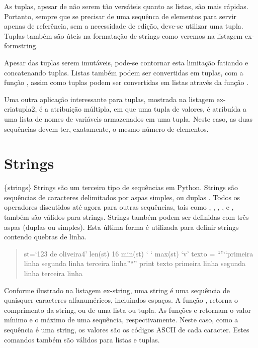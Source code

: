 \documentclass[a4paper,10pt,portuguese]{sphinxmanual}
\begin{document}
As tuplas, apesar de não serem tão versáteis quanto as listas, são
mais rápidas. Portanto, sempre que se precisar de uma sequênca de
elementos para servir apenas de referência, sem a necessidade de
edição, deve-se utilizar uma tupla. Tuplas também são úteis na
formatação de strings como veremos na listagem ex-formstring.

Apesar das tuplas serem imutáveis, pode-se contornar esta limitação
fatiando e concatenando tuplas. Listas também podem ser convertidas
em tuplas, com a função , assim como tuplas podem
ser convertidas em listas através da função .

Uma outra aplicação interessante para tuplas, mostrada na listagem
ex-criatupla2, é a atribuição múltipla, em que uma tupla de
valores, é atribuída a uma lista de nomes de variáveis armazenados
em uma tupla. Neste caso, as duas sequências devem ter, exatamente,
o mesmo número de elementos.


\section{Strings}
\label{Cap2:strings}
\{strings\} Strings são um terceiro tipo de sequências em Python.
Strings são sequências de caracteres delimitados por aspas simples,
 ou duplas . Todos os operadores
discutidos até agora para outras sequências, tais como \code{+},
\code{*}, , ,  e , também são
válidos para strings. Strings também podem ser definidas com três
aspas (duplas ou simples). Esta última forma é utilizada para
definir strings contendo quebras de linha.
\begin{quote}

st=`123 de oliveira4' len(st) 16 min(st) ` ` max(st) `v' texto =
``''``primeira linha segunda linha terceira linha''``'' print texto
primeira linha segunda linha terceira linha
\end{quote}

Conforme ilustrado na listagem ex-string, uma string é uma
sequência de quaisquer caracteres alfanuméricos, incluindos
espaços. A função , retorna o comprimento da string, ou de
uma lista ou tupla. As funções  e  retornam o
valor mínimo e o máximo de uma sequência, respectivamente. Neste
caso, como a sequência é uma string, os valores são os códigos
ASCII de cada caracter. Estes comandos também são válidos para
listas e tuplas.
\end{document}
